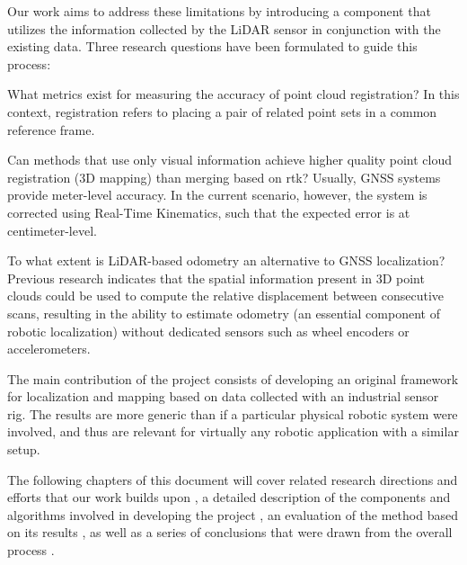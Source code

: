 Our work aims to address these limitations by introducing a component that utilizes the information collected by the LiDAR sensor in conjunction with the existing data. Three research questions have been formulated to guide this process:

\begin{compactenum}
    \item What metrics exist for measuring the accuracy of point cloud \gls{registration}? In this context, registration refers to placing a pair of related point sets in a common reference frame.

    \item Can methods that use only visual information achieve higher quality point cloud registration (3D mapping) than merging based on \acrfull{rtk}? Usually, GNSS systems provide meter-level accuracy. In the current scenario, however, the system is corrected using Real-Time Kinematics, such that the expected error is at centimeter-level.

    \item To what extent is LiDAR-based \gls{odometry} an alternative to GNSS localization? Previous research indicates that the spatial information present in 3D point clouds could be used to compute the relative displacement between consecutive scans, resulting in the ability to estimate odometry (an essential component of robotic localization) without dedicated sensors such as wheel encoders or accelerometers.
\end{compactenum}

The main contribution of the project consists of developing an original framework for localization and mapping based on data collected with an industrial sensor rig. The results are more generic than if a particular physical robotic system were involved, and thus are relevant for virtually any robotic application with a similar setup.

The following chapters of this document will cover related research directions and efforts that our work builds upon , a detailed description of the components and algorithms involved in developing the project , an evaluation of the method based on its results , as well as a series of conclusions that were drawn from the overall process .




